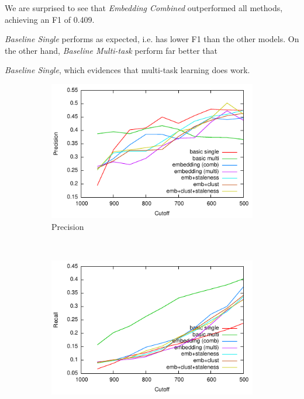 \documentclass{article}
\begin{document}
We are surprised to see that {\textit{Embedding Combined}} outperformed all methods, achieving an F1 of 0.409. {\textit{Baseline Single} performs as expected, i.e. has lower F1 than the other models. On the other hand, {\textit{Baseline Multi-task}} perform far better that {\textit{Baseline Single}, which evidences that multi-task learning does work.

\def \officialRunWidth {0.23\textwidth}
\begin{figure}[tb]
  \centering
    \begin{subfigure}[b]{\officialRunWidth}
            \includegraphics[width=\textwidth]{fig/official/official-prec}
			\caption{Precision}
			\label{official:prec}
    \end{subfigure}
    ~
    \begin{subfigure}[b]{\officialRunWidth}
            \includegraphics[width=\textwidth]{fig/official/official-recall}

\end{subfigure}
\end{figure}}}
\end{document}
